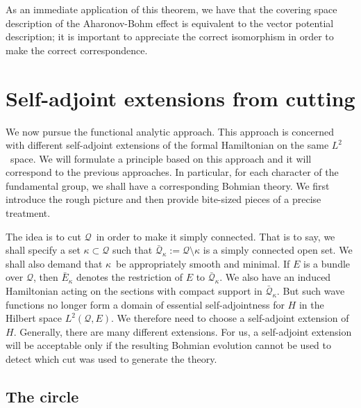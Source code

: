 \documentclass[11pt]{article}
\theoremstyle{remark}
\begin{document}
As an immediate application of this theorem, we have that the
covering space description of the Aharonov-Bohm effect is equivalent
to the vector potential description; it is important to appreciate the
correct 
isomorphism in order to make the correct correspondence. 


\section{Self-adjoint extensions from cutting} \label{s:sa}


We now pursue the functional analytic approach. This approach is
concerned with different self-adjoint extensions of the formal
Hamiltonian on the same \ensuremath{L^{2}}\ space. We will formulate a principle
based on this approach and it will correspond to the previous approaches. In
particular, for each character of the fundamental group, we shall have
a corresponding Bohmian theory. 
We first introduce the rough picture and then provide bite-sized
pieces of a precise treatment.

The idea is to cut \ensuremath{\mathcal{Q}}\ in order to make it simply connected. That
is to say, we shall specify a set $\ensuremath{\kappa} \subset \ensuremath{\mathcal{Q}}$ such that $
\ensuremath{\bar{\ensuremath{\mathcal{Q}}}_{\ensuremath{\kappa}}} \ensuremath{:=} \ensuremath{\mathcal{Q}} \setminus \ensuremath{\kappa}$ is a simply connected open
set. We shall also demand that \ensuremath{\kappa}\ be appropriately smooth and
minimal. If $E$ is a bundle over \ensuremath{\mathcal{Q}}, then $\ensuremath{\bar{E}_{\ensuremath{\kappa}}}$ denotes the
restriction of  $E$ to $\ensuremath{\bar{\ensuremath{\mathcal{Q}}}_{\ensuremath{\kappa}}}$. 
We also have an induced Hamiltonian  acting on
the sections with compact support in \ensuremath{\bar{\ensuremath{\mathcal{Q}}}_{\ensuremath{\kappa}}}. But  such
wave functions no longer form a domain of essential self-adjointness for $H$ in the
Hilbert space $\ensuremath{L^{2}}(\ensuremath{\mathcal{Q}}, E)$. We
therefore need to choose a self-adjoint extension of $H$. 
Generally, there are many different extensions. 
For us, a self-adjoint extension will be acceptable only if 
the resulting Bohmian evolution cannot be used to detect which
cut was used to generate the theory. 


\subsection{The circle}
\end{document}
